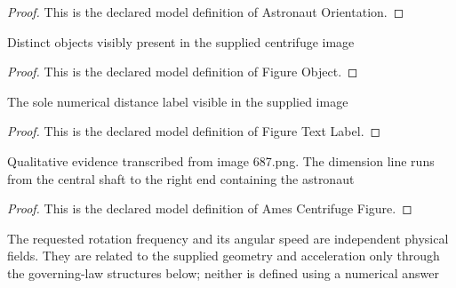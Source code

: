 \begin{proof}
  This is the declared model definition of Astronaut Orientation.
\end{proof}
\begin{definition}
  \label{def:physics:phyx-mini-0687:phyxminiproblems-problemphyxmini0687-figureobject}
  Distinct objects visibly present in the supplied centrifuge image
\end{definition}
\begin{proof}
  This is the declared model definition of Figure Object.
\end{proof}
\begin{definition}
  \label{def:physics:phyx-mini-0687:phyxminiproblems-problemphyxmini0687-figuretextlabel}
  The sole numerical distance label visible in the supplied image
\end{definition}
\begin{proof}
  This is the declared model definition of Figure Text Label.
\end{proof}
\begin{definition}
  \label{def:physics:phyx-mini-0687:phyxminiproblems-problemphyxmini0687-amescentrifugefigure}
  Qualitative evidence transcribed from image 687.png. The dimension line runs from the central shaft to the right end containing the astronaut
\end{definition}
\begin{proof}
  This is the declared model definition of Ames Centrifuge Figure.
\end{proof}
\begin{definition}
  \label{def:physics:phyx-mini-0687:phyxminiproblems-problemphyxmini0687-amestwentygcentrifugesetup}
  The requested rotation frequency and its angular speed are independent physical fields. They are related to the supplied geometry and acceleration only through the governing-law structures below; neither is defined using a numerical answer
\end{definition}
